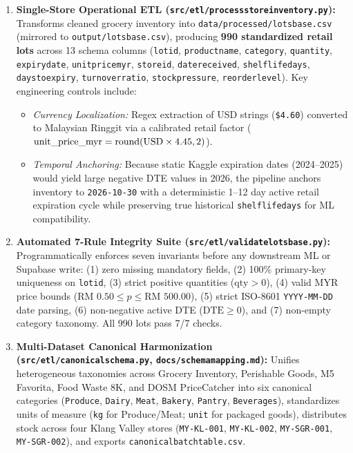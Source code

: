 \documentclass[11pt,a4paper]{article}
\renewcommand{\_}{\oldunderscore\allowbreak}
\begin{document}
\begin{enumerate}[leftmargin=18pt, itemsep=3pt]
    \item \textbf{Single-Store Operational ETL (\texttt{src/etl/process\_store\_inventory.py}):} Transforms cleaned grocery inventory into \texttt{data/processed/lots\_base.csv} (mirrored to \texttt{output/lots\_base.csv}), producing \textbf{990 standardized retail lots} across 13 schema columns (\texttt{lot\_id}, \texttt{product\_name}, \texttt{category}, \texttt{quantity}, \texttt{expiry\_date}, \texttt{unit\_price\_myr}, \texttt{store\_id}, \texttt{date\_received}, \texttt{shelf\_life\_days}, \texttt{days\_to\_expiry}, \texttt{turnover\_ratio}, \texttt{stock\_pressure}, \texttt{reorder\_level}). Key engineering controls include:
    \begin{itemize}[leftmargin=14pt, itemsep=1pt]
        \item \emph{Currency Localization:} Regex extraction of USD strings (\texttt{\$4.60}) converted to Malaysian Ringgit via a calibrated retail factor ($\text{unit\_price\_myr} = \text{round}(\text{USD} \times 4.45, 2)$).
        \item \emph{Temporal Anchoring:} Because static Kaggle expiration dates (2024--2025) would yield large negative DTE values in 2026, the pipeline anchors inventory to \texttt{2026-10-30} with a deterministic 1--12 day active retail expiration cycle while preserving true historical \texttt{shelf\_life\_days} for ML compatibility.
    \end{itemize}
    \item \textbf{Automated 7-Rule Integrity Suite (\texttt{src/etl/validate\_lots\_base.py}):} Programmatically enforces seven invariants before any downstream ML or Supabase write: (1) zero missing mandatory fields, (2) 100\% primary-key uniqueness on \texttt{lot\_id}, (3) strict positive quantities ($\text{qty} > 0$), (4) valid MYR price bounds ($\text{RM } 0.50 \le p \le \text{RM } 500.00$), (5) strict ISO-8601 \texttt{YYYY-MM-DD} date parsing, (6) non-negative active DTE ($\text{DTE} \ge 0$), and (7) non-empty category taxonomy. All 990 lots pass 7/7 checks.
    \item \textbf{Multi-Dataset Canonical Harmonization (\texttt{src/etl/canonical\_schema.py}, \texttt{docs/schema\_mapping.md}):} Unifies heterogeneous taxonomies across Grocery Inventory, Perishable Goods, M5 Favorita, Food Waste 8K, and DOSM PriceCatcher into six canonical categories (\texttt{Produce}, \texttt{Dairy}, \texttt{Meat}, \texttt{Bakery}, \texttt{Pantry}, \texttt{Beverages}), standardizes units of measure (\texttt{kg} for Produce/Meat; \texttt{unit} for packaged goods), distributes stock across four Klang Valley stores (\texttt{MY-KL-001}, \texttt{MY-KL-002}, \texttt{MY-SGR-001}, \texttt{MY-SGR-002}), and exports \texttt{canonical\_batch\_table.csv}.

\end{enumerate}
\end{document}
